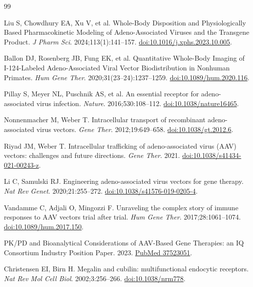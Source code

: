 \documentclass[UTF8,11pt,a4paper]{ctexart}
\begin{document}
\clearpage
\begin{thebibliography}{99}

Liu S, Chowdhury EA, Xu V, et al. Whole-Body Disposition and Physiologically Based Pharmacokinetic Modeling of Adeno-Associated Viruses and the Transgene Product. \textit{J Pharm Sci}. 2024;113(1):141--157. \href{https://doi.org/10.1016/j.xphs.2023.10.005}{doi:10.1016/j.xphs.2023.10.005}.

Ballon DJ, Rosenberg JB, Fung EK, et al. Quantitative Whole-Body Imaging of I-124-Labeled Adeno-Associated Viral Vector Biodistribution in Nonhuman Primates. \textit{Hum Gene Ther}. 2020;31(23--24):1237--1259. \href{https://doi.org/10.1089/hum.2020.116}{doi:10.1089/hum.2020.116}.

Pillay S, Meyer NL, Puschnik AS, et al. An essential receptor for adeno-associated virus infection. \textit{Nature}. 2016;530:108--112. \href{https://doi.org/10.1038/nature16465}{doi:10.1038/nature16465}.

Nonnenmacher M, Weber T. Intracellular transport of recombinant adeno-associated virus vectors. \textit{Gene Ther}. 2012;19:649--658. \href{https://doi.org/10.1038/gt.2012.6}{doi:10.1038/gt.2012.6}.

Riyad JM, Weber T. Intracellular trafficking of adeno-associated virus (AAV) vectors: challenges and future directions. \textit{Gene Ther}. 2021. \href{https://doi.org/10.1038/s41434-021-00243-z}{doi:10.1038/s41434-021-00243-z}.

Li C, Samulski RJ. Engineering adeno-associated virus vectors for gene therapy. \textit{Nat Rev Genet}. 2020;21:255--272. \href{https://doi.org/10.1038/s41576-019-0205-4}{doi:10.1038/s41576-019-0205-4}.

Vandamme C, Adjali O, Mingozzi F. Unraveling the complex story of immune responses to AAV vectors trial after trial. \textit{Hum Gene Ther}. 2017;28:1061--1074. \href{https://doi.org/10.1089/hum.2017.150}{doi:10.1089/hum.2017.150}.

PK/PD and Bioanalytical Considerations of AAV-Based Gene Therapies: an IQ Consortium Industry Position Paper. 2023. \href{https://pubmed.ncbi.nlm.nih.gov/37523051/}{PubMed 37523051}.

Christensen EI, Birn H. Megalin and cubilin: multifunctional endocytic receptors. \textit{Nat Rev Mol Cell Biol}. 2002;3:256--266. \href{https://doi.org/10.1038/nrm778}{doi:10.1038/nrm778}.


\end{thebibliography}
\end{document}

